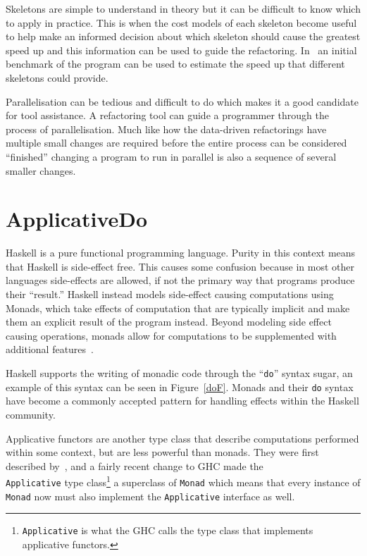Skeletons are simple to understand in theory but it can be difficult to know which to apply in practice. This is when the cost models of each skeleton become useful to help make an informed decision about which skeleton should cause the greatest speed up and this information can be used to guide the refactoring. In~\cite{parallelErl} an initial benchmark of the program can be used to estimate the speed up that different skeletons could provide.

Parallelisation can be tedious and difficult to do which makes it a good candidate for tool assistance. A refactoring tool can guide a programmer through the process of parallelisation. Much like how the data-driven refactorings have multiple small changes are required before the entire process can be considered ``finished'' changing a program to run in parallel is also a sequence of several smaller changes.

\section{ApplicativeDo}\label{applicativeDo}

Haskell is a pure functional programming language. Purity in this context means that Haskell is side-effect free. This causes some confusion because in most other languages side-effects are allowed, if not the primary way that programs produce their ``result.'' Haskell instead models side-effect causing computations using Monads, which take effects of computation that are typically implicit and make them an explicit result of the program instead. Beyond modeling side effect causing operations, monads allow for computations to be supplemented with additional features~\citep{haskellWikiMonad}.

Haskell supports the writing of monadic code through the ``\texttt{do}'' syntax sugar, an example of this syntax can be seen in Figure~\ref{doF}. Monads and their \texttt{do} syntax have become a commonly accepted pattern for handling effects within the Haskell community. 

Applicative functors are another type class that describe computations performed within some context, but are less powerful than monads. They were first described by~\cite{mcbrideIdioms}, and a fairly recent change to GHC made the\\ \texttt{Applicative} type class\footnote{\texttt{Applicative} is what the GHC calls the type class that implements applicative functors.} a superclass of \texttt{Monad} which means that every instance of \texttt{Monad} now must also implement the \texttt{Applicative} interface as well.   

